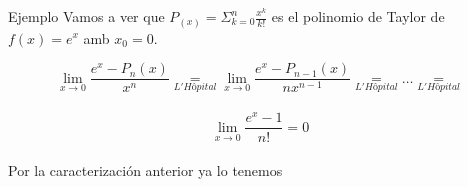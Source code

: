 \begin{frame}{Ejemplo}
  Vamos a ver que $P_(x)= \Sigma^{n}_{k=0} \frac{x^k}{k!}$ es el polinomio
  de Taylor de $f(x)=e^x$ amb $x_0=0$.
  
  $$\lim_{x \rightarrow 0} \frac{e^x-P_n(x)}{x^n}\underset{L'Hôpital}{=}
  \lim_{x \rightarrow 0} \frac{e^x-P_{n-1}(x)}{nx^{n-1}}\underset{L'Hôpital}{=} \dots \underset{L'Hôpital}{=}$$
  \\
  $$\lim_{x \rightarrow 0} \frac{e^x-1}{n!}=0$$ 
  \\
  
  Por la caracterización anterior ya lo tenemos      
\end{frame}
